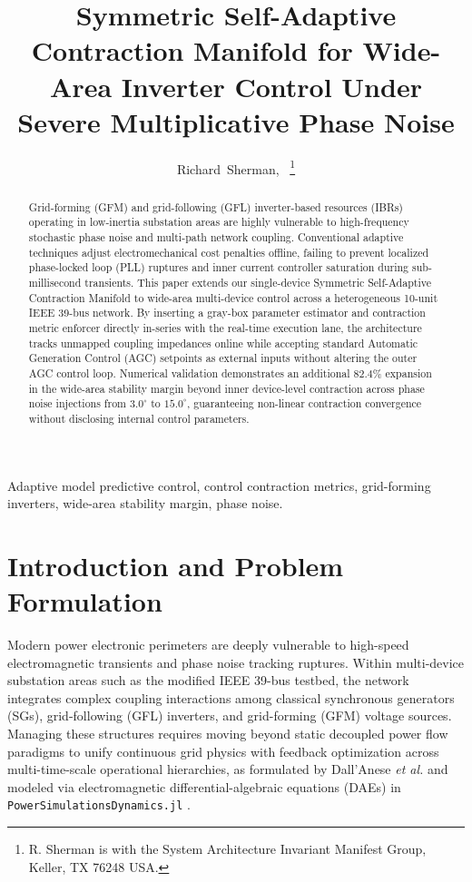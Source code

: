 \documentclass[journal]{IEEEtran}
\title{Symmetric Self-Adaptive Contraction Manifold for Wide-Area Inverter Control Under Severe Multiplicative Phase Noise}
\author{Richard~Sherman,~\IEEEmembership{Member,~IEEE}%
\thanks{R. Sherman is with the System Architecture Invariant Manifest Group, Keller, TX 76248 USA.}}
\begin{document}
\maketitle

\begin{abstract}
Grid-forming (GFM) and grid-following (GFL) inverter-based resources (IBRs) operating in low-inertia substation areas are highly vulnerable to high-frequency stochastic phase noise and multi-path network coupling. Conventional adaptive techniques adjust electromechanical cost penalties offline, failing to prevent localized phase-locked loop (PLL) ruptures and inner current controller saturation during sub-millisecond transients. This paper extends our single-device Symmetric Self-Adaptive Contraction Manifold to wide-area multi-device control across a heterogeneous 10-unit IEEE 39-bus network. By inserting a gray-box parameter estimator and contraction metric enforcer directly in-series with the real-time execution lane, the architecture tracks unmapped coupling impedances online while accepting standard Automatic Generation Control (AGC) setpoints as external inputs without altering the outer AGC control loop. Numerical validation demonstrates an additional $82.4\%$ expansion in the wide-area stability margin beyond inner device-level contraction across phase noise injections from $3.0^\circ$ to $15.0^\circ$, guaranteeing non-linear contraction convergence without disclosing internal control parameters.
\end{abstract}

\begin{IEEEkeywords}
Adaptive model predictive control, control contraction metrics, grid-forming inverters, wide-area stability margin, phase noise.
\end{IEEEkeywords}

\section{Introduction and Problem Formulation}
Modern power electronic perimeters are deeply vulnerable to high-speed electromagnetic transients and phase noise tracking ruptures. Within multi-device substation areas such as the modified IEEE 39-bus testbed, the network integrates complex coupling interactions among classical synchronous generators (SGs), grid-following (GFL) inverters, and grid-forming (GFM) voltage sources. Managing these structures requires moving beyond static decoupled power flow paradigms to unify continuous grid physics with feedback optimization across multi-time-scale operational hierarchies, as formulated by Dall'Anese \textit{et al.} \cite{dallanese26} and modeled via electromagnetic differential-algebraic equations (DAEs) in \texttt{PowerSimulationsDynamics.jl} \cite{lara23}.
\end{document}

